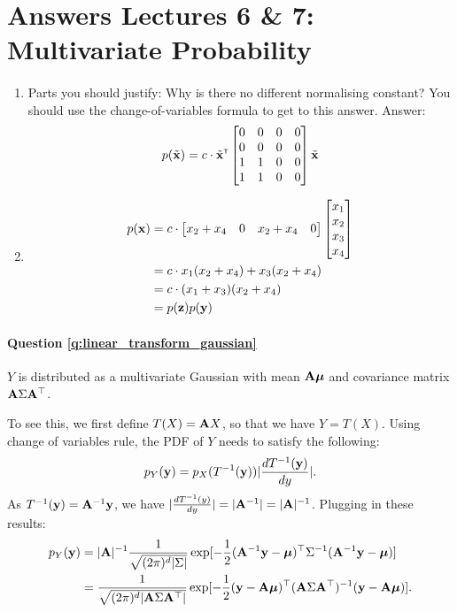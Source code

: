 \section{Answers Lectures 6 \& 7: Multivariate Probability}

\paragraph{}
\begin{enumerate}[label=\alph*.]
\item Parts you should justify: Why is there no different normalising constant? You should use the change-of-variables formula to get to this answer. Answer:
\begin{align}
p(\tilde {\mathbf{x}}) = c \cdot \tilde {\mathbf{x}}^\mathrm{\textsf{\tiny T}} \begin{bmatrix}0 & 0 & 0 & 0 \\ 0 & 0 & 0 & 0 \\ 1 & 1 & 0 & 0 \\ 1 & 1 & 0 & 0\end{bmatrix} \tilde {\mathbf{x}}
\end{align}
\item
\begin{align}
p(\mathbf{x}) &= c \cdot \begin{bmatrix}x_2 + x_4 & 0 & x_2 + x_4 & 0\end{bmatrix}\begin{bmatrix}x_1 \\ x_2 \\ x_3 \\ x_4\end{bmatrix} \\
&= c \cdot x_1 (x_2+x_4) + x_3(x_2 +x_4) \\
&= c \cdot (x_1 + x_3)(x_2+x_4) \\
&= p(\mathbf{z})p(\mathbf{y})
\end{align}
\end{enumerate}

\paragraph{Question \ref{q:linear_transform_gaussian}}
$Y$ is distributed as a multivariate Gaussian with mean $\mathbf A \bm{\mu}$ and covariance matrix $\mathbf A \Sigma \mathbf A^\top$.

To see this, we first define $T(X) = \mathbf A X$, so that we have $Y = T(X)$. Using change of variables rule, the PDF of $Y$ needs to satisfy the following:
$$p_Y(\mathbf{y}) = p_X(T^{-1}(\mathbf{y})) | \frac{dT^{-1}(\mathbf{y})}{dy} | .$$
As $T^{-1}(\mathbf{y}) = \mathbf A^{-1} \mathbf{y}$, we have $| \frac{dT^{-1}(y)}{dy} | = | \mathbf A^{-1} | = | \mathbf A |^{-1}$. Plugging in these results:
\begin{equation*}
\begin{aligned}
p_Y(\mathbf{y}) &=  |\mathbf A |^{-1} \frac{1}{\sqrt{(2 \pi)^d |\Sigma|}} \exp[-\frac{1}{2} (\mathbf A^{-1} \mathbf{y} - \bm{\mu})^\top \Sigma^{-1} (\mathbf A^{-1} \mathbf{y} - \bm{\mu})] \\
& = \frac{1}{\sqrt{(2 \pi)^d |\mathbf A \Sigma \mathbf A^\top|}} \exp[-\frac{1}{2} (\mathbf{y} - \mathbf A \bm{\mu})^\top (\mathbf A \Sigma \mathbf A^{\top})^{-1} ( \mathbf{y} - \mathbf A \bm{\mu})].
\end{aligned}
\end{equation*}

